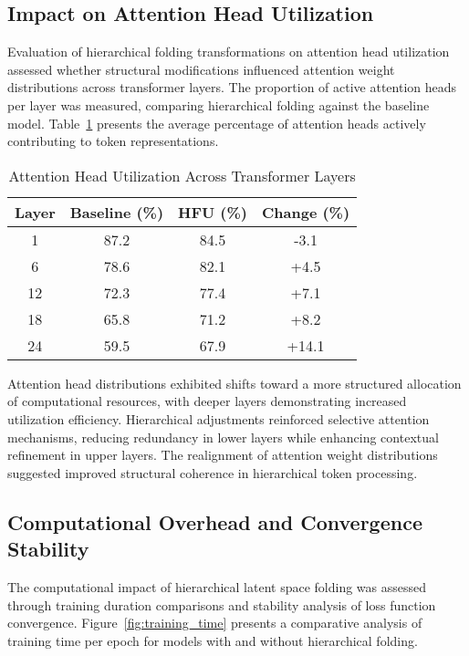 \documentclass[5p,times]{elsarticle}
\begin{document}
\subsection{Impact on Attention Head Utilization}

Evaluation of hierarchical folding transformations on attention head utilization assessed whether structural modifications influenced attention weight distributions across transformer layers. The proportion of active attention heads per layer was measured, comparing hierarchical folding against the baseline model. Table~\ref{tab:attention_heads} presents the average percentage of attention heads actively contributing to token representations.

\begin{table}[h]
	\centering
	\caption{Attention Head Utilization Across Transformer Layers}
	\label{tab:attention_heads}
	\begin{tabular}{|c|c|c|c|}
		\hline
		Layer & Baseline (\%) & HFU (\%) & Change (\%) \\
		\hline
		1 & 87.2 & 84.5 & -3.1 \\
		6 & 78.6 & 82.1 & +4.5 \\
		12 & 72.3 & 77.4 & +7.1 \\
		18 & 65.8 & 71.2 & +8.2 \\
		24 & 59.5 & 67.9 & +14.1 \\
		\hline
	\end{tabular}
\end{table}

Attention head distributions exhibited shifts toward a more structured allocation of computational resources, with deeper layers demonstrating increased utilization efficiency. Hierarchical adjustments reinforced selective attention mechanisms, reducing redundancy in lower layers while enhancing contextual refinement in upper layers. The realignment of attention weight distributions suggested improved structural coherence in hierarchical token processing.

\subsection{Computational Overhead and Convergence Stability}

The computational impact of hierarchical latent space folding was assessed through training duration comparisons and stability analysis of loss function convergence. Figure~\ref{fig:training_time} presents a comparative analysis of training time per epoch for models with and without hierarchical folding.
\end{document}

